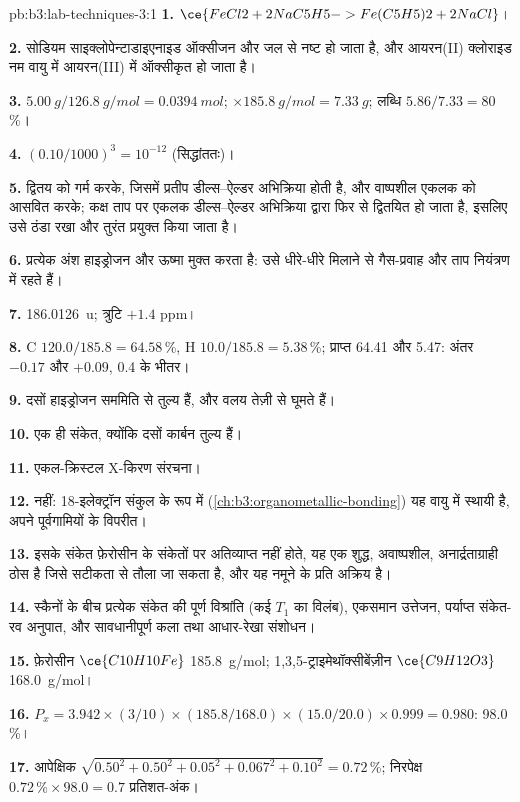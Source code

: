 \begin{solution}{pb:b3:lab-techniques-3:1}
\textbf{1.} $\ce{FeCl2 + 2NaC5H5 -> Fe(C5H5)2 + 2NaCl}$।

\textbf{2.} सोडियम साइक्लोपेन्टाडाइएनाइड ऑक्सीजन और जल से नष्ट हो जाता है, और आयरन(II)
क्लोराइड नम वायु में आयरन(III) में ऑक्सीकृत हो जाता है।

\textbf{3.} $\qty{5.00}{g}/\qty{126.8}{g/mol} = \qty{0.0394}{mol}$; $\times \qty{185.8}{g/mol} = \qty{7.33}{g}$; लब्धि $5.86/7.33 = 80$\,\%।

\textbf{4.} $(0.10/1000)^3 = 10^{-12}$ (सिद्धांततः)।

\textbf{5.} द्वितय को गर्म करके, जिसमें प्रतीप डील्स--ऐल्डर अभिक्रिया होती है, और
वाष्पशील एकलक को आसवित करके; कक्ष ताप पर एकलक डील्स--ऐल्डर अभिक्रिया द्वारा फिर से
द्वितयित हो जाता है, इसलिए उसे ठंडा रखा और तुरंत प्रयुक्त किया जाता है।

\textbf{6.} प्रत्येक अंश हाइड्रोजन और ऊष्मा मुक्त करता है: उसे धीरे-धीरे मिलाने से गैस-प्रवाह
और ताप नियंत्रण में रहते हैं।

\textbf{7.} \qty{186.0126}{u}; त्रुटि $+1.4$ ppm।

\textbf{8.} C $120.0/185.8 = 64.58$\,\%, H $10.0/185.8 = 5.38$\,\%; प्राप्त 64.41 और 5.47: अंतर $-0.17$ और $+0.09$, 0.4 के भीतर।

\textbf{9.} दसों हाइड्रोजन सममिति से तुल्य हैं, और वलय तेज़ी से घूमते हैं।

\textbf{10.} एक ही संकेत, क्योंकि दसों कार्बन तुल्य हैं।

\textbf{11.} एकल-क्रिस्टल X-किरण संरचना।

\textbf{12.} नहीं: 18-इलेक्ट्रॉन संकुल के रूप में (\cref{ch:b3:organometallic-bonding}) यह वायु में स्थायी है, अपने
पूर्वगामियों के विपरीत।

\textbf{13.} इसके संकेत फ़ेरोसीन के संकेतों पर अतिव्याप्त नहीं होते, यह एक शुद्ध, अवाष्पशील,
अनार्द्रताग्राही ठोस है जिसे सटीकता से तौला जा सकता है, और यह नमूने के प्रति
अक्रिय है।

\textbf{14.} स्कैनों के बीच प्रत्येक संकेत की पूर्ण विश्रांति (कई $T_1$ का विलंब),
एकसमान उत्तेजन, पर्याप्त संकेत-रव अनुपात, और सावधानीपूर्ण कला तथा आधार-रेखा
संशोधन।

\textbf{15.} फ़ेरोसीन $\ce{C10H10Fe}$ \qty{185.8}{g/mol}; 1,3,5-ट्राइमेथॉक्सीबेंज़ीन $\ce{C9H12O3}$ \qty{168.0}{g/mol}।

\textbf{16.} $P_x = 3.942 \times (3/10) \times (185.8/168.0) \times (15.0/20.0) \times 0.999 = 0.980$: 98.0\,\%।

\textbf{17.} आपेक्षिक $\sqrt{0.50^2 + 0.50^2 + 0.05^2 + 0.067^2 + 0.10^2} = 0.72$\,\%; निरपेक्ष $0.72\,\% \times 98.0 = 0.7$ प्रतिशत-अंक।


\end{solution}
